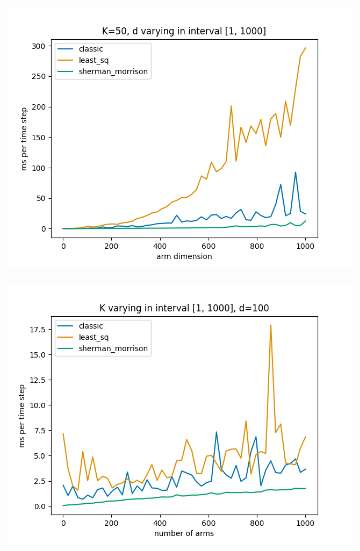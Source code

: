 \begin{figure}[h!]
  \centering
  \begin{subfigure}[b]{0.45\textwidth}
      \centering
      \includegraphics[width=\textwidth]{plots/d_varying_time.png}
      \label{fig:plot1}
  \end{subfigure}
  \hfill
  \begin{subfigure}[b]{0.45\textwidth}
      \centering
      \includegraphics[width=\textwidth]{plots/K_varying_time.png}
      \label{fig:plot2}
  \end{subfigure}
  \label{fig:combined_plots}
\end{figure}





